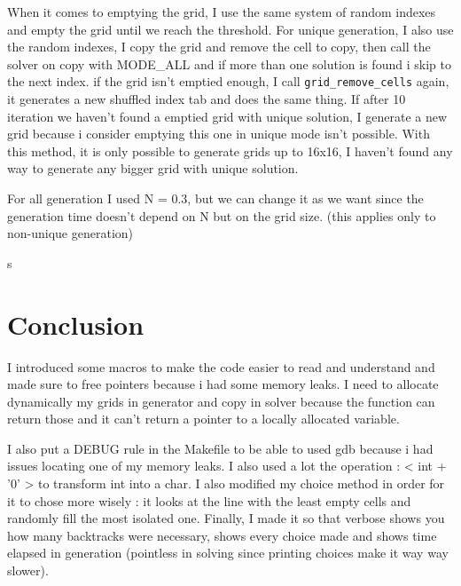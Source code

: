 \documentclass{article}
\begin{document}
When it comes to emptying the grid, I use the same system of random indexes and empty the grid until we reach the threshold. For unique generation, I also use the random indexes, I copy the grid and remove the cell to copy, then call the solver on copy with MODE\_ALL and if more than one solution is found i skip to the next index. if the grid isn't emptied enough, I call \texttt{grid\_remove\_cells} again, it generates a new shuffled index tab and does the same thing. If after 10 iteration we haven't found a emptied grid with unique solution, I generate a new grid because i consider emptying this one in unique mode isn't possible. With this method, it is only possible to generate grids up to 16x16, I haven't found any way to generate any bigger grid with unique solution.

For all generation I used N = 0.3, but we can change it as we want since the generation time doesn't depend on N but on the grid size. (this applies only to non-unique generation)

s\section{Conclusion}

I introduced some macros to make the code easier to read and understand and made sure to free pointers because i had some memory leaks. I need to allocate dynamically my grids in generator and copy in solver because the function can return those and it can't return a pointer to a locally allocated variable.

I also put a DEBUG rule in the Makefile to be able to used gdb because i had issues locating one of my memory leaks. I also used a lot the operation : < int + '0' > to transform int into a char. 
I also modified my choice method in order for it to chose more wisely : it looks at the line with the least empty cells and randomly fill the most isolated one. Finally, I made it so that verbose shows you how many backtracks were necessary, shows every choice made and shows time elapsed in generation (pointless in solving since printing choices make it way way slower).

\end{document}
